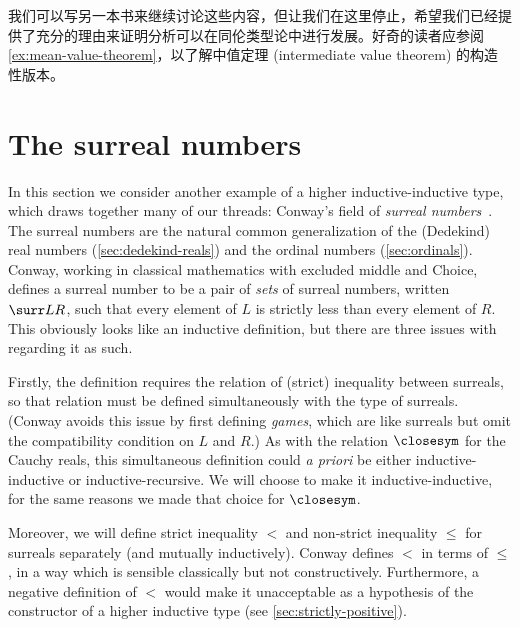 我们可以写另一本书来继续讨论这些内容，但让我们在这里停止，希望我们已经提供了充分的理由来证明分析可以在同伦类型论中进行发展。好奇的读者应参阅 \cref{ex:mean-value-theorem}，以了解中值定理 (intermediate value theorem) 的构造性版本。


%
%

\section{The surreal numbers}
\label{sec:surreals}

%

In this section we consider another example of a higher inductive-in\-duc\-tive type, which draws together many of our threads: Conway's field \NO of \emph{surreal numbers}~\cite{conway:onag}.
The surreal numbers are the natural common generalization of the (Dedekind) real numbers (\cref{sec:dedekind-reals}) and the ordinal numbers (\cref{sec:ordinals}).
Conway, working in classical mathematics with excluded middle and Choice, defines a surreal number to be a pair of \emph{sets} of surreal numbers, written $\surr L R$, such that every element of $L$ is strictly less than every element of $R$.
This obviously looks like an inductive definition, but there are three issues with regarding it as such.

Firstly, the definition requires the relation of (strict) inequality between surreals, so that relation must be defined simultaneously with the type \NO of surreals.
(Conway avoids this issue by first defining \emph{games}, which are like surreals but omit the compatibility condition on $L$ and $R$.)
As with the relation $\closesym$ for the Cauchy reals, this simultaneous definition could \emph{a priori} be either inductive-inductive or inductive-recursive.
We will choose to make it inductive-inductive, for the same reasons we made that choice for $\closesym$.

Moreover, we will define strict inequality $<$ and non-strict inequality $\le$ for surreals separately (and mutually inductively).
Conway defines $<$ in terms of $\le$, in a way which is sensible classically but not constructively.
%
Furthermore, a negative definition of $<$ would make it unacceptable as a hypothesis of the constructor of a higher inductive type (see \cref{sec:strictly-positive}).

